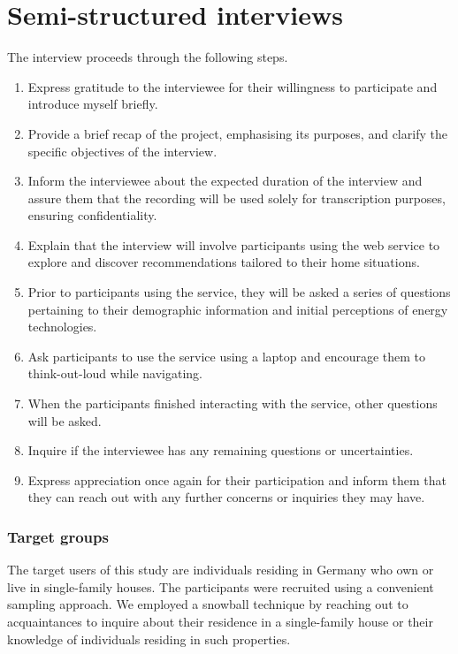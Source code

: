 \section{Semi-structured interviews}

The interview proceeds through the following steps.
\begin{enumerate}
  \item Express gratitude to the interviewee for their willingness to participate and introduce myself briefly.
  \item Provide a brief recap of the project, emphasising its purposes, and clarify the specific objectives of the interview.
  \item Inform the interviewee about the expected duration of the interview and assure them that the recording will be used solely for transcription purposes, ensuring confidentiality.
  \item Explain that the interview will involve participants using the web service to explore and discover recommendations tailored to their home situations.
  \item Prior to participants using the service, they will be asked a series of questions pertaining to their demographic information and initial perceptions of energy technologies.
  \item Ask participants to use the service using a laptop and encourage them to think-out-loud while navigating.
  \item When the participants finished interacting with the service, other questions will be asked.
  \item Inquire if the interviewee has any remaining questions or uncertainties.
  \item Express appreciation once again for their participation and inform them that they can reach out with any further concerns or inquiries they may have.
\end{enumerate}


\subsubsection{Target groups}

The target users of this study are individuals residing in Germany who own or live in single-family houses.
The participants were recruited using a convenient sampling approach. 
We employed a snowball technique by reaching out to acquaintances to inquire about their residence in a single-family house or their knowledge of individuals residing in such properties. 

